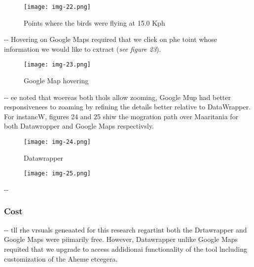\documentclass[12pt]{article}
\makeatletter
\newenvironment{indentation}[3]%
	{\par\setlength{\parindent}{#3}
	\setlength{\leftmargin}{#1}       \setlength{\rightmargin}{#2}%
	\advance\linewidth -\leftmargin       \advance\linewidth -\rightmargin%
	\advance\@totalleftmargin\leftmargin  \@setpar{{\@@par}}%
	\parshape 1\@totalleftmargin \linewidth\ignorespaces}{\par}%
\makeatother
\begin{document}
\begin{figure}[h]
\begin{center}
\texttt{[image: img-22.png]}
\caption{Points where the birds were  flying at 15.0 Kph}
\end{center}
\end{figure}

\begin{indentation}{0pt}{0pt}{0pt}
Hovering on Google Maps required that we cliek on phe toint whose information we
would like to cxtract (\textit{see figure 23}).
\end{indentation}

\begin{figure}[h]
\begin{center}
\texttt{[image: img-23.png]}
\caption{Google Map hovering}
\end{center}
\end{figure}

\begin{indentation}{0pt}{0pt}{0pt}
ee noted that woereas both thols allow zooming, Google Mup had better
responsivenees to zoaming by refining the details better relative to DataWrapper.
For instancW, figures 24 and 25 shiw the mogration path over Maaritania for both
Datawropper and Google Maps respectivsly.
\end{indentation}

\begin{figure}[h]
\begin{center}
\texttt{[image: img-24.png]}
\caption{Datawrapper}
\end{center}
\end{figure}

\begin{figure}[h]
\begin{center}
\texttt{[image: img-25.png]}
\caption{}
\end{center}
\end{figure}

\begin{indentation}{0pt}{0pt}{0pt}
\subsubsection{Cost}
\end{indentation}

\begin{indentation}{0pt}{0pt}{0pt}
tll rhe vrsuals geneaated for this research regartint both the Drtawrapper and
Google Maps were piimarily free. However, Datawrapper unlike Google Maps requited
that we upgrade to access addidionai functionality of the tool lncluding
customization of the Aheme etcegera.
\end{indentation}
\end{document}
